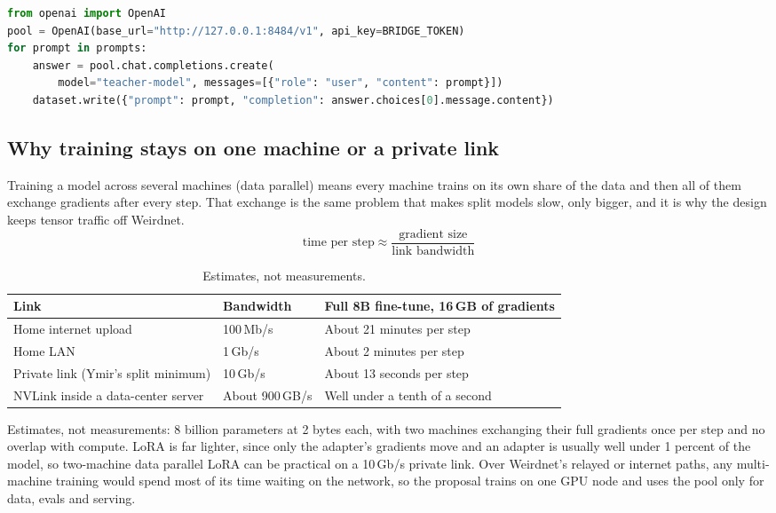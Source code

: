 \begin{lstlisting}[language=Python, caption={Sketch only: distil through the loopback bridge with any OpenAI client.}]
from openai import OpenAI
pool = OpenAI(base_url="http://127.0.0.1:8484/v1", api_key=BRIDGE_TOKEN)
for prompt in prompts:
    answer = pool.chat.completions.create(
        model="teacher-model", messages=[{"role": "user", "content": prompt}])
    dataset.write({"prompt": prompt, "completion": answer.choices[0].message.content})
\end{lstlisting}

\subsection{Why training stays on one machine or a private link}\label{sec:training-bandwidth}

Training a model across several machines (data parallel) means every machine trains on its own
share of the data and then all of them exchange gradients after every step. That exchange is the
same problem that makes split models slow, only bigger, and it is why the design keeps tensor
traffic off Weirdnet.
\[
  \text{time per step} \approx \frac{\text{gradient size}}{\text{link bandwidth}}
\]

\begin{table}[htbp]
\centering\small
\begin{tabularx}{\linewidth}{@{}llY@{}}
\toprule
Link & Bandwidth & Full 8B fine-tune, 16\,GB of gradients \\
\midrule
Home internet upload & 100\,Mb/s & About 21 minutes per step \\
Home LAN & 1\,Gb/s & About 2 minutes per step \\
Private link (Ymir's split minimum) & 10\,Gb/s & About 13 seconds per step \\
NVLink inside a data-center server & About 900\,GB/s & Well under a tenth of a second \\
\bottomrule
\end{tabularx}
\caption*{\footnotesize Estimates, not measurements.}
\end{table}

Estimates, not measurements: 8 billion parameters at 2 bytes each, with two machines exchanging
their full gradients once per step and no overlap with compute. LoRA is far lighter, since only
the adapter's gradients move and an adapter is usually well under 1 percent of the model, so
two-machine data parallel LoRA can be practical on a 10\,Gb/s private link. Over Weirdnet's
relayed or internet paths, any multi-machine training would spend most of its time waiting on the
network, so the proposal trains on one GPU node and uses the pool only for data, evals and
serving.

